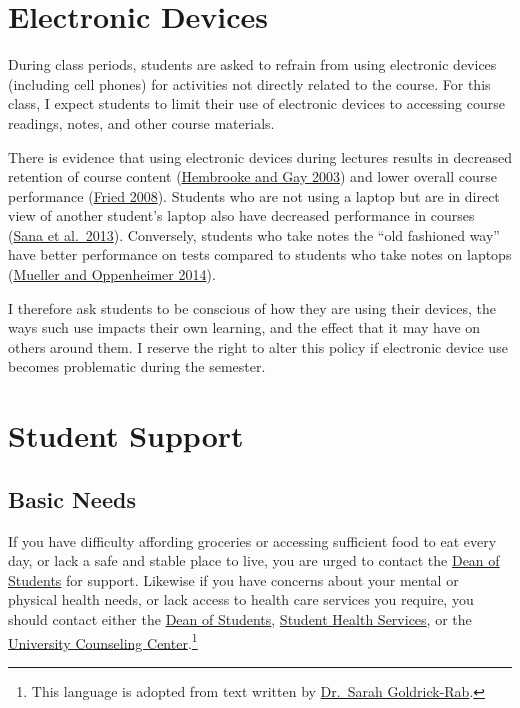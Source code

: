 \documentclass[]{book}
\let\rmarkdownfootnote\footnote%
\def\footnote{\protect\rmarkdownfootnote}
\theoremstyle{definition}
\theoremstyle{definition}
\theoremstyle{definition}
\theoremstyle{remark}
\begin{document}
\hypertarget{electronic-devices}{%
\section{Electronic Devices}\label{electronic-devices}}

During class periods, students are asked to refrain from using
electronic devices (including cell phones) for activities not directly
related to the course. For this class, I expect students to limit their
use of electronic devices to accessing course readings, notes, and other
course materials.

There is evidence that using electronic devices during lectures results
in decreased retention of course content
(\href{https://link.springer.com/article/10.1007/BF02940852}{Hembrooke
and Gay 2003}) and lower overall course performance
(\href{https://www.sciencedirect.com/science/article/pii/S0360131506001436}{Fried
2008}). Students who are not using a laptop but are in direct view of
another student's laptop also have decreased performance in courses
(\href{https://www.sciencedirect.com/science/article/pii/S0360131512002254}{Sana
et al.~2013}). Conversely, students who take notes the ``old fashioned
way'' have better performance on tests compared to students who take
notes on laptops
(\href{http://journals.sagepub.com/doi/abs/10.1177/0956797614524581}{Mueller
and Oppenheimer 2014}).

I therefore ask students to be conscious of how they are using their
devices, the ways such use impacts their own learning, and the effect
that it may have on others around them. I reserve the right to alter
this policy if electronic device use becomes problematic during the
semester.

\hypertarget{student-support}{%
\section{Student Support}\label{student-support}}

\hypertarget{basic-needs}{%
\subsection{Basic Needs}\label{basic-needs}}

If you have difficulty affording groceries or accessing sufficient food
to eat every day, or lack a safe and stable place to live, you are urged
to contact the
\href{https://www.slu.edu/student-development/dean-of-students/index.php}{Dean
of Students} for support. Likewise if you have concerns about your
mental or physical health needs, or lack access to health care services
you require, you should contact either the
\href{https://www.slu.edu/student-development/dean-of-students/index.php}{Dean
of Students},
\href{https://www.slu.edu/life-at-slu/student-health/index.php}{Student
Health Services}, or the
\href{https://www.slu.edu/life-at-slu/university-counseling/index.php}{University
Counseling Center}.\footnote{This language is adopted from text written
  by
  \href{https://medium.com/@saragoldrickrab/basic-needs-security-and-the-syllabus-d24cc7afe8c9}{Dr.~Sarah
  Goldrick-Rab}.}
\end{document}
